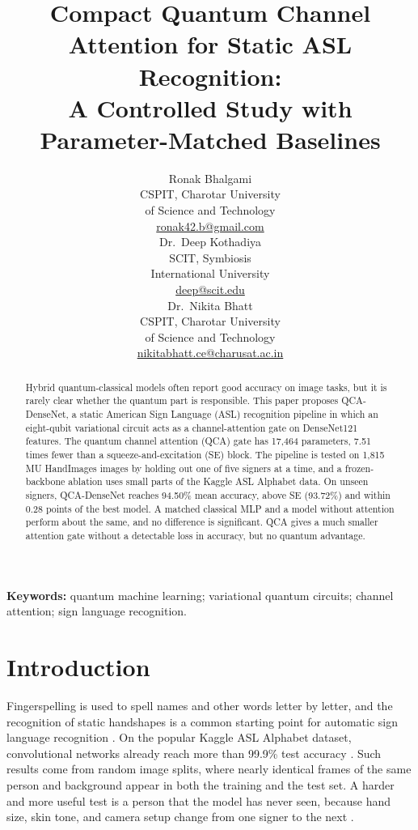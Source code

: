 \documentclass[10pt,twocolumn]{article}
\title{Compact Quantum Channel Attention for Static ASL Recognition:\\
A Controlled Study with Parameter-Matched Baselines}
\author{\normalsize
\begin{tabular}[t]{c}
Ronak Bhalgami\\
CSPIT, Charotar University\\
of Science and Technology\\
\href{mailto:ronak42.b@gmail.com}{ronak42.b@gmail.com}
\end{tabular}\hspace{1.5em}%
\begin{tabular}[t]{c}
Dr.~Deep Kothadiya\\
SCIT, Symbiosis\\
International University\\
\href{mailto:deep@scit.edu}{deep@scit.edu}
\end{tabular}\hspace{1.5em}%
\begin{tabular}[t]{c}
Dr.~Nikita Bhatt\\
CSPIT, Charotar University\\
of Science and Technology\\
\href{mailto:nikitabhatt.ce@charusat.ac.in}{nikitabhatt.ce@charusat.ac.in}
\end{tabular}%
}
\date{}
\newcommand{\QCA}{QCA}
\begin{document}
\maketitle

\begin{abstract}
Hybrid quantum-classical models often report good accuracy on image tasks,
but it is rarely clear whether the quantum part is responsible. This paper
proposes QCA-DenseNet, a static American Sign Language (ASL) recognition
pipeline in which an eight-qubit variational circuit acts as a
channel-attention gate on DenseNet121 features. The quantum channel attention
(\QCA{}) gate has 17,464 parameters, 7.51 times fewer than a
squeeze-and-excitation (SE) block. The pipeline is tested on 1,815 MU
HandImages images by holding out one of five signers at a time, and a
frozen-backbone ablation uses small parts of the Kaggle ASL Alphabet data. On
unseen signers, QCA-DenseNet reaches 94.50\% mean accuracy, above SE
(93.72\%) and within 0.28 points of the best model. A matched classical MLP
and a model without attention perform about the same, and no difference is
significant. \QCA{} gives a much smaller attention gate without a detectable
loss in accuracy, but no quantum advantage.
\end{abstract}

\noindent\textbf{Keywords:} quantum machine learning; variational quantum
circuits; channel attention; sign language recognition.

\section{Introduction}
\label{sec:intro}

Fingerspelling is used to spell names and other words letter by letter, and
the recognition of static handshapes is a common starting point for
automatic sign language recognition \citep{rastgoo_2021_survey,wadhawan_2020_static}.
On the popular Kaggle ASL Alphabet dataset, convolutional networks already
reach more than 99.9\% test accuracy \citep{alsharif_2023_asl}. Such
results come from random image splits, where nearly identical frames of the
same person and background appear in both the training and the test set. A
harder and more useful test is a person that the model has never seen,
because hand size, skin tone, and camera setup change from one signer to the
next \citep{erdogan_2024_signer,sahoo_2022_mu}.
\end{document}
